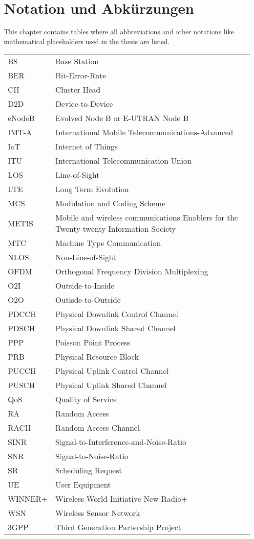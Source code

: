 \chapter{Notation und Abkürzungen}
This chapter contains tables where all abbreviations and other notations like mathematical
placeholders used in the thesis are listed.
\begin{table}[h]
\begin{tabular}{ll}
BS & Base Station\\
BER & Bit-Error-Rate\\
CH & Cluster Head\\
D2D & Device-to-Device\\
eNodeB & Evolved Node B or E-UTRAN Node B\\
IMT-A & International Mobile Telecommunications-Advanced\\
IoT & Internet of Things\\
ITU & International Telecommunication Union\\
LOS & Line-of-Sight\\
LTE & Long Term Evolution\\
MCS & Modulation and Coding Scheme\\
METIS & Mobile and wireless communications Enablers for the Twenty-twenty Information Society \\
MTC & Machine Type Communication\\
NLOS & Non-Line-of-Sight\\
OFDM & Orthogonal Frequency Division Multiplexing\\
O2I & Outside-to-Inside\\
O2O & Outisde-to-Outside\\
PDCCH & Physical Downlink Control Channel\\
PDSCH & Physical Downlink Shared Channel\\
PPP & Poisson Point Process\\
PRB & Physical Resource Block\\
PUCCH & Physical Uplink Control Channel\\
PUSCH & Physical Uplink Shared Channel\\
QoS & Quality of Service\\
RA & Random Access\\
RACH & Random Access Channel\\
SINR & Signal-to-Interference-and-Noise-Ratio\\
SNR & Signal-to-Noise-Ratio\\ 
SR & Scheduling Request\\
UE & User Equipment\\
WINNER+ & Wireless World Initiative New Radio+ \\
WSN & Wireless Sensor Network\\
3GPP & Third Generation Partership Project\\
\end{tabular}
\end{table}

